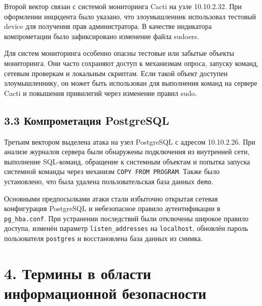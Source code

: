 \documentclass[14pt]{extarticle}
\begin{document}
Второй вектор связан с системой мониторинга Cacti на узле 10.10.2.32. При оформлении инцидента было указано, что злоумышленник использовал тестовый device для получения прав администратора. В качестве индикатора компрометации было зафиксировано изменение файла sudoers.

Для систем мониторинга особенно опасны тестовые или забытые объекты мониторинга. Они часто сохраняют доступ к механизмам опроса, запуску команд, сетевым проверкам и локальным скриптам. Если такой объект доступен злоумышленнику, он может быть использован для выполнения команд на сервере Cacti и повышения привилегий через изменение правил sudo.

\subsection*{3.3 Компрометация PostgreSQL}

Третьим вектором выделена атака на узел PostgreSQL с адресом 10.10.2.26. При анализе журналов сервера были обнаружены подключения из внутренней сети, выполнение SQL-команд, обращение к системным объектам и попытка запуска системной команды через механизм \texttt{COPY FROM PROGRAM}. Также было установлено, что была удалена пользовательская база данных \texttt{demo}.

Основными предпосылками атаки стали избыточно открытая сетевая конфигурация PostgreSQL и небезопасное правило аутентификации в \texttt{pg\_hba.conf}. При устранении последствий были отключены широкое правило доступа, изменён параметр \texttt{listen\_addresses} на \texttt{localhost}, обновлён пароль пользователя \texttt{postgres} и восстановлена база данных из снимка.

\clearpage

\section*{4. Термины в области информационной безопасности}
\end{document}
